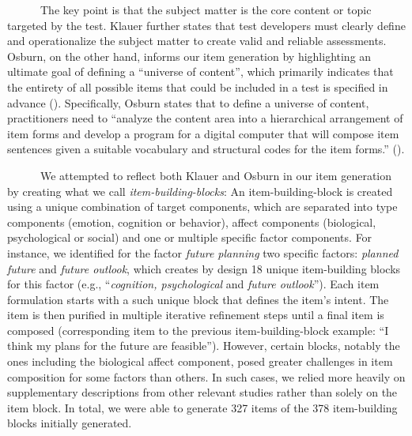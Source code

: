 \documentclass[
  man,floatsintext]{apa7}
\begin{document}
~~~~~~The key point is that the subject matter is the core content or topic targeted by the test. Klauer further states that test developers must clearly define and operationalize the subject matter to create valid and reliable assessments. Osburn, on the other hand, informs our item generation by highlighting an ultimate goal of defining a ``universe of content'', which primarily indicates that the entirety of all possible items that could be included in a test is specified in advance (). Specifically, Osburn states that to define a universe of content, practitioners need to ``analyze the content area into a hierarchical arrangement of item forms and develop a program for a digital computer that will compose item sentences given a suitable vocabulary and structural codes for the item forms.'' ().

~~~~~~We attempted to reflect both Klauer and Osburn in our item generation by creating what we call \emph{item-building-blocks}: An item-building-block is created using a unique combination of target components, which are separated into type components (emotion, cognition or behavior), affect components (biological, psychological or social) and one or multiple specific factor components. For instance, we identified for the factor \emph{future planning} two specific factors: \emph{planned future} and \emph{future outlook}, which creates by design 18 unique item-building blocks for this factor (e.g., ``\emph{cognition, psychological} and \emph{future outlook}''). Each item formulation starts with a such unique block that defines the item's intent. The item is then purified in multiple iterative refinement steps until a final item is composed (corresponding item to the previous item-building-block example: ``I think my plans for the future are feasible''). However, certain blocks, notably the ones including the biological affect component, posed greater challenges in item composition for some factors than others. In such cases, we relied more heavily on supplementary descriptions from other relevant studies rather than solely on the item block. In total, we were able to generate 327 items of the 378 item-building blocks initially generated.
\end{document}
